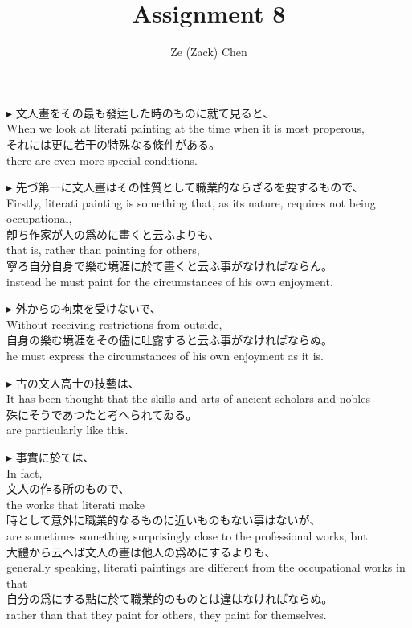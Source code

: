 \documentclass{ctexart}
\title{Assignment 8}
\author{Ze (Zack) Chen}
\makeatletter
\newcommand*{\shifttext}[1]{%
  \settowidth{\@tempdima}{#1}%
  \hspace{-\@tempdima}#1%
}
\newcommand{\plabel}[1]{%
\shifttext{\textbf{#1}\quad}%
}
\makeatother
\begin{document}
\maketitle

\plabel{$\blacktriangleright$}%
文人畫をその最も發逹した時のものに就て見ると、\\
When we look at literati painting at the time when it is most properous,\\
それには更に若干の特殊なる條件がある。\\
there are even more special conditions.

\vspace{1em}
\plabel{$\blacktriangleright$}%
先づ第一に文人畫はその性質として職業的ならざるを要するもので、\\
Firstly, literati painting is something that, as its nature, requires not being occupational,\\
卽ち作家が人の爲めに畫くと云ふよりも、\\
that is, rather than painting for others,\\
寧ろ自分自身で樂む境涯に於て畫くと云ふ事がなければならん。\\
instead he must paint for the circumstances of his own enjoyment.

\vspace{1em}
\plabel{$\blacktriangleright$}%
外からの拘束を受けないで、\\
Without receiving restrictions from outside,\\
自身の樂む境涯をその儘に吐露すると云ふ事がなければならぬ。\\
he must express the circumstances of his own enjoyment as it is.

\vspace{1em}
\plabel{$\blacktriangleright$}%
古の文人高士の技藝は、\\
It has been thought that the skills and arts of ancient scholars and nobles\\
殊にそうであつたと考へられてゐる。\\
are particularly like this.

\vspace{1em}
\plabel{$\blacktriangleright$}%
事實に於ては、\\
In fact,\\
文人の作る所のもので、\\
the works that literati make\\
時として意外に職業的なるものに近いものもない事はないが、\\
are sometimes something surprisingly close to the professional works, but\\
大體から云へば文人の畫は他人の爲めにするよりも、\\
generally speaking, literati paintings are different from the occupational works in that\\
自分の爲にする點に於て職業的のものとは違はなければならぬ。\\
rather than that they paint for others, they paint for themselves.
\end{document}

